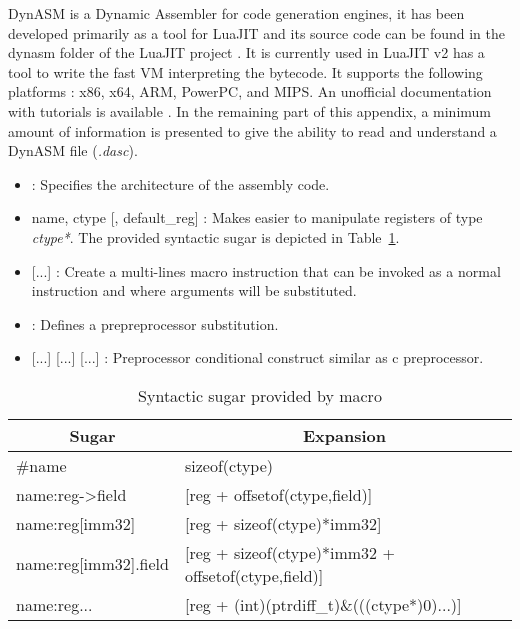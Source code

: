 
DynASM is a Dynamic Assembler for code generation engines, it has been developed
primarily as a tool for LuaJIT and its source code can be found in the dynasm
folder of the LuaJIT project \cite{luajit-src}. It is currently used in LuaJIT
v2 has a tool to write the fast VM interpreting the bytecode. It supports the
following platforms : x86, x64, ARM, PowerPC, and MIPS. An unofficial
documentation with tutorials is available \cite{dynasm}. In the remaining part
of this appendix, a minimum amount of information is presented to give the
ability to read and understand a DynASM file (\emph{.dasc}).



\begin{itemize}
    \item {} : Specifies the architecture of the assembly code.
    \item {} name, ctype [, default\_reg] : Makes easier to manipulate registers of type \emph{ctype*}. The provided syntactic sugar is depicted in
Table~\ref{tab:type-sugar}.
    \item {} [...]  : Create a multi-lines
macro instruction that can be invoked as a normal instruction and where arguments
will be substituted.
    \item {} : Defines a prepreprocessor substitution.
    \item {} [...]  [...]  [...]  : Preprocessor conditional construct similar as c preprocessor.
\end{itemize}

\begin{table}
\centering
\begin{tabular}{|l|l|}
\hline
\multicolumn{1}{|c|}{Sugar} & \multicolumn{1}{c|}{Expansion} \\\hline
\#name                      & sizeof(ctype)\\
name:reg-\textgreater field & [reg + offsetof(ctype,field)]\\
name:reg[imm32]             & [reg + sizeof(ctype)*imm32]\\
name:reg[imm32].field       & [reg + sizeof(ctype)*imm32 + offsetof(ctype,field)]\\
name:reg...                 & [reg + (int)(ptrdiff\_t)\&(((ctype*)0)...)]\\\hline
\end{tabular}
\caption{Syntactic sugar provided by  macro}
\label{tab:type-sugar}
\end{table}

